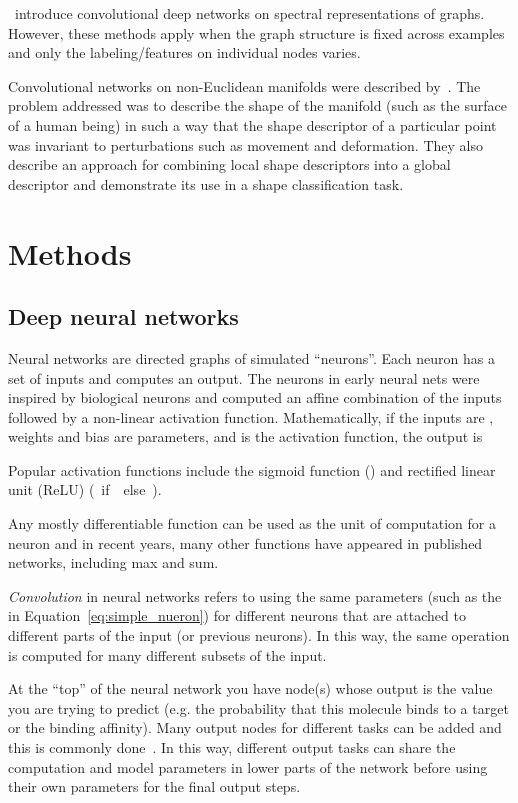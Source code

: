 \citet{bruna2013spectral}~introduce convolutional deep networks on spectral
representations of graphs. However, these methods apply when the graph structure
is fixed across examples and only the labeling/features on individual nodes
varies.

Convolutional networks on non-Euclidean manifolds were described
by~\citet{masci2015geodesic}. The problem addressed was to describe
the shape of the manifold (such as the surface of a human being) in such a way
that the shape descriptor of a particular point was invariant to perturbations
such as movement and deformation. They also describe an approach for combining
local shape descriptors into a global descriptor and demonstrate its use in a
shape classification task.

\section{Methods}

\subsection{Deep neural networks}\label{sec:neural_nets}

Neural networks are directed graphs of simulated ``neurons''. Each neuron has a
set of inputs and computes an output. The neurons in early neural nets were
inspired by biological neurons and computed an affine combination of the inputs
followed by a non-linear activation function. Mathematically, if the inputs are
, weights  and bias  are parameters, and  is
the activation function, the output is

Popular activation functions include the sigmoid function ()
and rectified linear unit (ReLU) (~if~~else~).

Any mostly differentiable function can be
used as the unit of computation for a neuron and in recent years, many other
functions have appeared in published networks, including max and sum.

\emph{Convolution} in neural networks refers to using the same parameters (such as the
 in Equation~\ref{eq:simple_nueron}) for different neurons that are attached
to different parts of the input (or previous neurons). In this way, the same
operation is computed for many different subsets of the input.

At the ``top'' of the neural network you have node(s) whose output is the value
you are trying to predict (e.g. the probability that this molecule binds to a
target or the binding affinity). Many output nodes for
different tasks can be added and this is commonly
done~\citep{ma2015deep, ramsundar2015massively}. In this way, different
output tasks can share the computation and model parameters in lower parts of
the network before using their own parameters for the final output steps.

